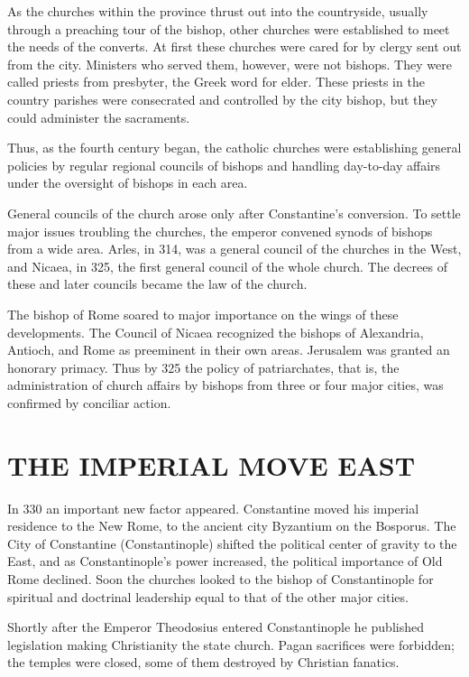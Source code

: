 As the churches within the province thrust out into the countryside, usually through a preaching
tour of the bishop, other churches were established to meet the needs of the converts. At first
these churches were cared for by clergy sent out from the city. Ministers who served them, however,
were not bishops. They were called priests from presbyter, the Greek word for elder. These priests
in the country parishes were consecrated and controlled by the city bishop, but they could
administer the sacraments.

Thus, as the fourth century began, the catholic churches were establishing general policies by
regular regional councils of bishops and handling day-to-day affairs under the oversight of bishops
in each area.

General councils of the church arose only after Constantine’s conversion. To settle major issues
troubling the churches, the emperor convened synods of bishops from a wide area. Arles, in 314, was
a general council of the churches in the West, and Nicaea, in 325, the first general council of the
whole church. The decrees of these and later councils became the law of the church.

The bishop of Rome soared to major importance on the wings of these developments. The Council of
Nicaea recognized the bishops of Alexandria, Antioch, and Rome as preeminent in their own areas.
Jerusalem was granted an honorary primacy. Thus by 325 the policy of patriarchates, that is, the
administration of church affairs by bishops from three or four major cities, was confirmed by
conciliar action.

\section{THE IMPERIAL MOVE EAST}

In 330 an important new factor appeared. Constantine moved his imperial residence to the New Rome,
to the ancient city Byzantium on the Bosporus. The City of Constantine (Constantinople) shifted the
political center of gravity to the East, and as Constantinople’s power increased, the political
importance of Old Rome declined. Soon the churches looked to the bishop of Constantinople for
spiritual and doctrinal leadership equal to that of the other major cities.

Shortly after the Emperor Theodosius entered Constantinople he published legislation making
Christianity the state church. Pagan sacrifices were forbidden; the temples were closed, some of
them destroyed by Christian fanatics.

